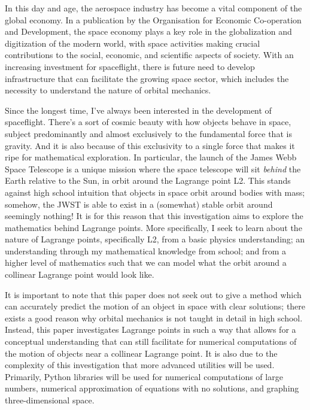In this day and age, the aerospace industry has become a vital component of the global economy.
In a publication by the Organisation for Economic Co-operation and Development, the space economy plays a key role in the globalization and digitization of the modern world, with space activities making crucial contributions to the social, economic, and scientific aspects of society\autocite{c5996201-en}.
With an increasing investment for spaceflight, there is future need to develop infrastructure that can facilitate the growing space sector, which includes the necessity to understand the nature of orbital mechanics.

Since the longest time, I've always been interested in the development of spaceflight.
There's a sort of cosmic beauty with how objects behave in space, subject predominantly and almost exclusively to the fundamental force that is gravity.
And it is also because of this exclusivity to a single force that makes it ripe for mathematical exploration.
In particular, the launch of the James Webb Space Telescope is a unique mission where the space telescope will sit \textit{behind} the Earth relative to the Sun, in orbit around the Lagrange point L2.
This stands against high school intuition that objects in space orbit around bodies with mass; somehow, the JWST is able to exist in a (somewhat) stable orbit around seemingly nothing!
It is for this reason that this investigation aims to explore the mathematics behind Lagrange points.
More specifically, I seek to learn about the nature of Lagrange points, specifically L2, from a basic physics understanding; an understanding through my mathematical knowledge from school; and from a higher level of mathematics such that we can model what the orbit around a collinear Lagrange point would look like.

It is important to note that this paper does not seek out to give a method which can accurately predict the motion of an object in space with clear solutions; there exists a good reason why orbital mechanics is not taught in detail in high school.
Instead, this paper investigates Lagrange points in such a way that allows for a conceptual understanding that can still facilitate for numerical computations of the motion of objects near a collinear Lagrange point.
It is also due to the complexity of this investigation that more advanced utilities will be used.
Primarily, Python libraries will be used for numerical computations of large numbers, numerical approximation of equations with no solutions, and graphing three-dimensional space.